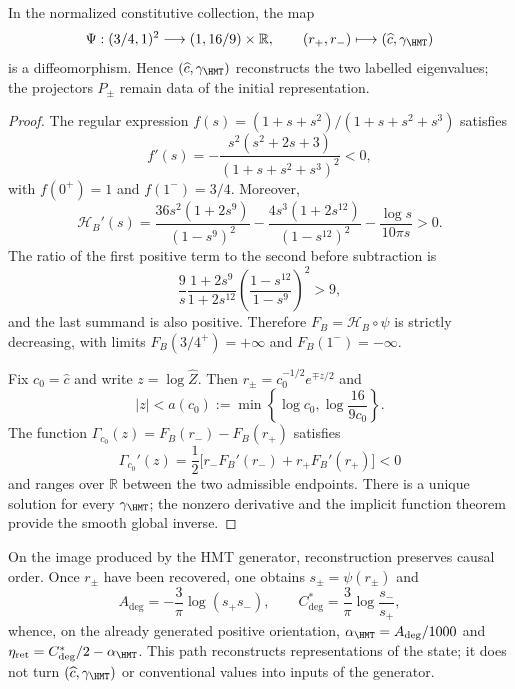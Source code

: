 \begin{theorem}
\label{v:thm:restitucion-c-gamma}
In the normalized constitutive collection, the map
\begin{equation}
 \Psi:(3/4,1)^2\longrightarrow(1,16/9)\times\mathbb R,
 \qquad
 (r_+,r_-)\longmapsto(\widehat c,\gamma_{\HMT})
 \label{v:eq:mapa-c-gamma}
\end{equation}
is a diffeomorphism. Hence $(\widehat c,\gamma_{\HMT})$ reconstructs
the two labelled eigenvalues; the projectors $P_\pm$ remain data of the
initial representation.
\end{theorem}
\begin{proof}
The regular expression $f(s)=(1+s+s^2)/(1+s+s^2+s^3)$ satisfies
\[
 f'(s)=-\frac{s^2(s^2+2s+3)}{(1+s+s^2+s^3)^2}<0,
\]
with $f(0^+)=1$ and $f(1^-)=3/4$. Moreover,
\begin{equation}
 \mathcal H_B'(s)=
 \frac{36s^2(1+2s^9)}{(1-s^9)^2}
 -\frac{4s^3(1+2s^{12})}{(1-s^{12})^2}
 -\frac{\log s}{10\pi s}>0.
 \label{v:eq:monotonia-hb}
\end{equation}
The ratio of the first positive term to the second before subtraction is
\[
 \frac9s\frac{1+2s^9}{1+2s^{12}}
 \left(\frac{1-s^{12}}{1-s^9}\right)^2>9,
\]
and the last summand is also positive. Therefore
$F_B=\mathcal H_B\circ\psi$ is strictly decreasing, with limits
$F_B(3/4^+)=+\infty$ and $F_B(1^-)=-\infty$.

Fix $c_0=\widehat c$ and write $z=\log\widehat Z$. Then
$r_\pm=c_0^{-1/2}e^{\mp z/2}$ and
\[
 |z|<a(c_0):=\min\!\left\{\log c_0,
 \log\frac{16}{9c_0}\right\}.
\]
The function $\Gamma_{c_0}(z)=F_B(r_-)-F_B(r_+)$ satisfies
\[
 \Gamma_{c_0}'(z)=\frac12
 \bigl[r_-F_B'(r_-)+r_+F_B'(r_+)\bigr]<0
\]
and ranges over $\mathbb R$ between the two admissible endpoints. There is
a unique solution for every $\gamma_{\HMT}$; the nonzero derivative and
the implicit function theorem provide the smooth global inverse.
\end{proof}

On the image produced by the HMT generator, reconstruction preserves
causal order. Once $r_\pm$ have been recovered, one obtains
$s_\pm=\psi(r_\pm)$ and
\begin{equation}
 A_{\deg}=-\frac3\pi\log(s_+s_-),\qquad
 C^*_{\deg}=\frac3\pi\log\frac{s_-}{s_+},
 \label{v:eq:restitucion-angular-constitutiva}
\end{equation}
whence, on the already generated positive orientation,
$\alpha_{\HMT}=A_{\deg}/1000$ and
$\eta_{\mathrm{ret}}=C^*_{\deg}/2-\alpha_{\HMT}$. This path reconstructs
representations of the state; it does not turn
$(\widehat c,\gamma_{\HMT})$ or conventional values into inputs of the
generator.

